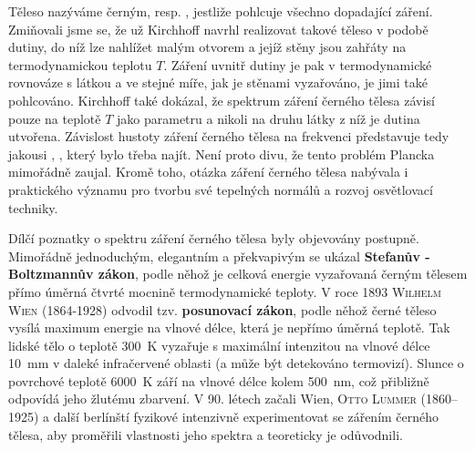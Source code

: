         Těleso nazýváme černým, resp. \emph{}, jestliže pohlcuje všechno
        dopadající záření. Zmiňovali jsme se, že už Kirchhoff navrhl realizovat takové těleso v
        podobě dutiny, do níž lze nahlížet malým otvorem a jejíž stěny jsou zahřáty na
        termodynamickou teplotu \(T\). Záření uvnitř dutiny je pak v termodynamické rovnováze s
        látkou a ve stejné míře, jak je stěnami vyzařováno, je jimi také pohlcováno. Kirchhoff také
        dokázal, že spektrum záření černého tělesa závisí pouze na teplotě \(T\) jako parametru a
        nikoli na druhu látky z níž je dutina utvořena. Závislost hustoty záření černého tělesa na
        frekvenci představuje tedy jakousi \emph{}, \emph{}, který bylo třeba najít. Není proto divu, že tento problém Plancka mimořádně zaujal.
        Kromě toho, otázka záření černého tělesa nabývala i praktického významu pro tvorbu své
        tepelných normálů a rozvoj osvětlovací techniky.


        Dílčí poznatky o spektru záření černého tělesa byly objevovány postupně. Mimořádně
        jednoduchým, elegantním a překvapivým se ukázal \textbf{Stefanův -Boltzmannův zákon}, podle
        něhož je celková energie vyzařovaná černým tělesem přímo úměrná čtvrté mocnině
        termodynamické teploty. V roce 1893 \textsc{Wilhelm Wien} (1864-1928) odvodil tzv.
        \textbf{posunovací zákon}, podle něhož černé těleso vysílá maximum energie na vlnové délce,
        která je nepřímo úměrná teplotě. Tak lidské tělo o teplotě \SI{300}{\K} vyzařuje s maximální
        intenzitou na vlnové délce \SI{10}{\mm} v daleké infračervené oblasti (a může být detekováno
        termovizí). Slunce o povrchové teplotě \SI{6000}{\K} září na vlnové délce kolem
        \SI{500}{\nm}, což přibližně odpovídá jeho žlutému zbarvení. V 90. létech začali Wien,
        \textsc{Otto Lummer} (1860–1925) a další berlínští fyzikové intenzivně experimentovat se
        zářením černého tělesa, aby proměřili vlastnosti jeho spektra a teoreticky je odůvodnili.

